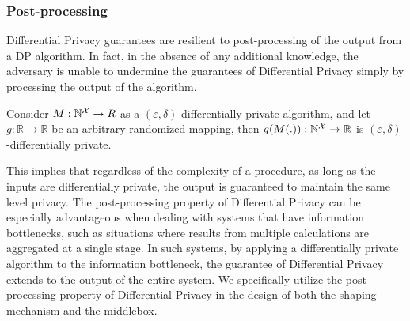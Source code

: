 \subsubsection{Post-processing}
\label{subsubsec:background-dp-postprocessing}
Differential Privacy guarantees are resilient to post-processing of the output from a DP algorithm.
In fact, in the absence of any additional knowledge, the adversary is unable to undermine the guarantees of Differential Privacy simply by processing the output of the algorithm.
\begin{proposition}
  \label{prop:post-processing}
  Consider $M: \mathbb{N}^\mathcal{X} \rightarrow R$ as a $(\varepsilon, \delta)$-differentially private algorithm, and let $g: \mathbb{R} \rightarrow \mathbb{R}$ be an arbitrary randomized mapping, then $g(M(.)): \mathbb{N}^\mathcal{X} \rightarrow \mathbb{R}$ is $(\varepsilon, \delta)$-differentially private. 
\end{proposition}
\noindent
This implies that regardless of the complexity of a procedure, as long as the inputs are differentially private, the output is guaranteed to maintain the same level privacy.
The post-processing property of Differential Privacy can be especially advantageous when dealing with systems that have information bottlenecks, such as situations where results from multiple calculations are aggregated at a single stage.
In such systems, by applying a differentially private algorithm to the information bottleneck, the guarantee of Differential Privacy extends to the output of the entire system. 
We specifically utilize the post-processing property of Differential Privacy in the design of both the {\sys} shaping mechanism and the {\sys} middlebox. 

